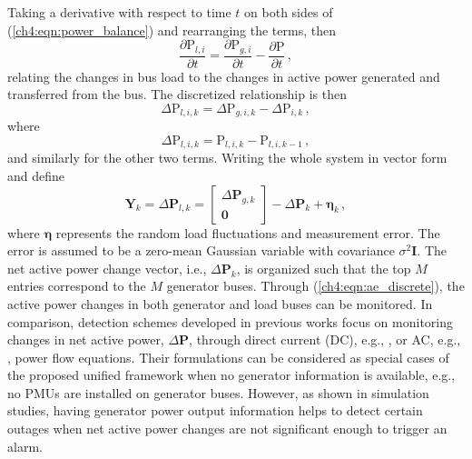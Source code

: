 Taking a derivative with respect to time $t$ on both sides
of (\ref{ch4:eqn:power_balance}) and rearranging the terms, then 
\begin{equation}
    \frac{\partial \text{P}_{l, i}}{\partial t} = \frac{\partial \text{P}_{g, i}}{\partial t} -  \frac{\partial \text{P}}{\partial t} \,,
\end{equation}
relating the changes in bus load to the changes in active power generated and transferred from the bus. The discretized relationship is then
\begin{equation}
\label{ch4:eqn:ae_discrete}
\Delta\text{P}_{l, i, k} = \Delta\text{P}_{g, i, k} -  \Delta\text{P}_{i, k}\,,
\end{equation}
where 
$$
\Delta\text{P}_{l, i, k} = \text{P}_{l, i, k} - \text{P}_{l, i, k-1} \,,
$$
and similarly for the other two terms. Writing the whole system in vector form and define
\begin{equation}
\label{ch4:eqn:ae_discrete}
\boldsymbol{Y}_{k} = \Delta\textbf{P}_{l, k} =
\left[
\begin{array}{c}
\Delta\textbf{P}_{g, k} \\
\boldsymbol{0}\,
\end{array}
\right]  - 
\Delta\textbf{P}_{k} + \boldsymbol{\eta}_k\,,
\end{equation}
where $\boldsymbol{\eta}$ represents the random load fluctuations and measurement error. The error is assumed to be a zero-mean Gaussian variable with covariance $\sigma^2\mathbf{I}$. The net active power change vector, i.e., $\Delta\textbf{P}_{k}$, is organized such that the top $M$ entries correspond to the $M$ generator buses. 
Through (\ref{ch4:eqn:ae_discrete}), the active power changes in both generator and load buses can be monitored. In comparison, detection schemes developed in previous works focus on monitoring changes in net active power, $\Delta\textbf{P}$, through direct current (DC), e.g., \cite{Chen2016}, or AC, e.g., \cite{yang2020control}, power flow equations. Their formulations can be considered as special cases of the proposed unified framework when no generator information is available, e.g., no PMUs are installed on generator buses. However, as shown in simulation studies, having generator power output information helps to detect certain outages when net active power changes are not significant enough to trigger an alarm.

